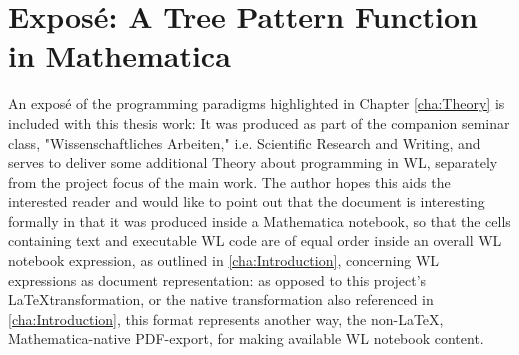 \chapter{Exposé: A Tree Pattern Function in Mathematica}
\label{app:Expose}


An exposé of the programming paradigms highlighted in Chapter \ref{cha:Theory} is included with this thesis work: It was produced as part of the companion seminar class, "Wissenschaftliches Arbeiten," i.e. Scientific Research and Writing, and serves to deliver some additional Theory about programming in WL, separately from the project focus of the main work. The author hopes this aids the interested reader and would like to point out that the document is interesting formally in that it was produced inside a Mathematica notebook, so that the cells containing text and executable WL code are of equal order inside an overall WL notebook expression, as outlined in \ref{cha:Introduction}, concerning WL expressions as document representation: as opposed to this project's \LaTeX transformation, or the native transformation also referenced in \ref{cha:Introduction}, this format represents another way, the non-\LaTeX, Mathematica-native PDF-export, for making available WL notebook content.


